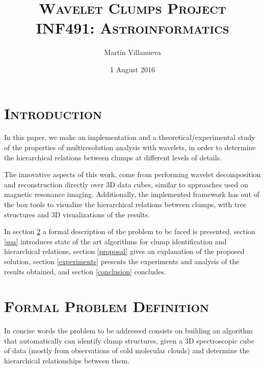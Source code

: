 \documentclass[letter, 11pt]{article}
\title{\textsc{Wavelet Clumps Project} \\
    \textsc{INF491: Astroinformatics}}
\author{Martín Villanueva}
\date{1 August 2016}
\begin{document}
\maketitle


\section{\textsc{Introduction}}

In this paper, we make an implementation and a theoretical/experimental study of the properties of multiresolution analysis with wavelets, in order to determine the hierarchical relations between clumps at different levels of details.

The innovative aspects of this work, come from performing wavelet decomposition and reconstruction directly over 3D data cubes, similar to approaches used on magnetic resonance imaging. Additionally, the implemented framework has out of the box tools to visualize the hierarchical relations between clumps, with tree structures and 3D visualizations of the results.

In section \ref{definition} a formal description of the problem to be faced is presented, section \ref{soa} introduces state of the art algorithms for clump identification and hierarchical relations, section \ref{proposal} gives an explanation of the proposed solution, section \ref{experiments} presents the experiments and analysis of the results obtained, and section \ref{conclusion} concludes.


\section{\textsc{Formal Problem Definition}} \label{definition}

In concise words the problem to be addressed consists on building an algorithm that automatically can identify clump structures, given a 3D spectroscopic cube of data (mostly from observations of cold molecular clouds) and determine the hierarchical relationships between them.\\
\end{document}

